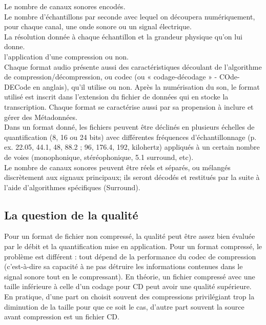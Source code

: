 \documentclass[12pt,a4paper]{report}
\begin{document}
    Le nombre de canaux sonores encodés.\\
  Le nombre d'échantillons par seconde avec lequel on découpera numériquement, pour chaque canal, une onde sonore ou un signal électrique.\\
   La résolution donnée à chaque échantillon et la grandeur physique qu'on lui donne.\\
    l'application d'une compression ou non.\\

Chaque format audio présente aussi des caractéristiques découlant de l'algorithme de compression/décompression, ou codec (ou « codage-décodage » - COde-DECode en anglais), qu'il utilise ou non. Après la numérisation du son, le format utilisé est inscrit dans l'extension du fichier de données qui en stocke la transcription. Chaque format se caractérise aussi par sa propension à inclure et gérer des Métadonnées.\\

Dans un format donné, les fichiers peuvent être déclinés en plusieurs échelles de quantification (8, 16 ou 24 bits) avec différentes fréquences d'échantillonnage (p. ex. 22.05, 44.1, 48, 88.2 ; 96, 176.4, 192, kilohertz) appliqués à un certain nombre de voies (monophonique, stéréophonique, 5.1 surround, etc).\\

Le nombre de canaux sonores peuvent être réels et séparés, ou mélangés discrètement aux signaux principaux; ils seront décodés et restitués par la suite à l'aide d'algorithmes spécifiques (Surround).\\


\subsection{La question de la qualité}
Pour un format de fichier non compressé, la qualité peut être assez bien évaluée par le débit et la quantification mise en application. Pour un format compressé, le problème est différent : tout dépend de la performance du codec de compression (c'est-à-dire sa capacité à ne pas détruire les informations contenues dans le signal sonore tout en le compressant). En théorie, un fichier compressé avec une taille inférieure à celle d'un codage pour CD peut avoir une qualité supérieure. En pratique, d'une part on choisit souvent des compressions privilégiant trop la diminution de la taille pour que ce soit le cas, d'autre part souvent la source avant compression est un fichier CD.\\
\end{document}
